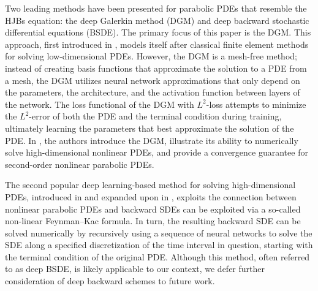 \documentclass[11pt,reqno]{amsart}
\numberwithin{equation}{section}
\theoremstyle{plain}
\begin{document}
Two leading methods have been presented for parabolic PDEs that resemble the HJBs equation: the deep Galerkin method (DGM) and deep backward stochastic differential equations (BSDE). The primary focus of this paper is the DGM. This approach, first introduced in \cite{dgm}, models itself after classical finite element methods for solving low-dimensional PDEs. However, the DGM is a mesh-free method; instead of creating basis functions that approximate the solution to a PDE from a mesh, the DGM utilizes neural network approximations that only depend on the parameters, the architecture, and the activation function between layers of the network. The loss functional of the DGM with $L^2$-loss attempts to minimize the $L^2$-error of both the PDE and the terminal condition during training, ultimately learning the parameters that best approximate the solution of the PDE. In \cite{dgm}, the authors introduce the DGM, illustrate its ability to numerically solve high-dimensional nonlinear PDEs, and provide a convergence guarantee for second-order nonlinear parabolic PDEs.

The second popular deep learning-based method for solving high-dimensional PDEs, introduced in \cite{deep-bsde-orig} and expanded upon in \cite{nonlinear-feynman-kac, db-schemes}, exploits the connection between nonlinear parabolic PDEs and backward SDEs can be exploited via a so-called non-linear Feynman--Kac formula. In turn, the resulting backward SDE can be solved numerically by recursively using a sequence of neural networks to solve the SDE along a specified discretization of the time interval in question, starting with the terminal condition of the original PDE. Although this method, often referred to as deep BSDE, is likely applicable to our context, we defer further consideration of deep backward schemes to future work.
\end{document}
